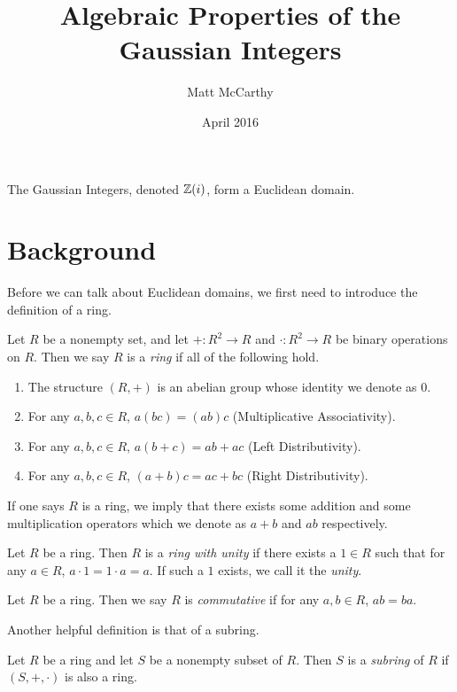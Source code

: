 \documentclass[notitlepage]{simple}
\title{Algebraic Properties of the Gaussian Integers}
\author{Matt McCarthy}
\date{April 2016}
\begin{document}
\maketitle

\begin{thm*}
	The Gaussian Integers, denoted $\mathbb{Z}(i)$, form a Euclidean domain.
\end{thm*}

\section{Background}

Before we can talk about Euclidean domains, we first need to introduce the definition of a ring.

\begin{definition}[Ring]
	Let $R$ be a nonempty set, and let $+:R^2\rightarrow R$ and $\cdot:R^2\rightarrow R$ be binary operations on $R$.
	Then we say $R$ is a \textit{ring} if all of the following hold.
	\begin{enumerate}
		\item The structure $(R,+)$ is an abelian group whose identity we denote as 0.
		\item For any $a,b,c\in R$, $a(bc)=(ab)c$ (Multiplicative Associativity).
		\item For any $a,b,c\in R$, $a(b+c)=ab+ac$ (Left Distributivity).
		\item For any $a,b,c\in R$, $(a+b)c=ac+bc$ (Right Distributivity).
	\end{enumerate}
	If one says $R$ is a ring, we imply that there exists some addition and some multiplication operators which we denote as $a+b$ and $ab$ respectively.
\end{definition}

\begin{definition}
	Let $R$ be a ring.
	Then $R$ is a \textit{ring with unity} if there exists a $1\in R$ such that for any $a\in R$, $a\cdot 1 = 1\cdot a = a$.
	If such a $1$ exists, we call it the \textit{unity}.
\end{definition}

\begin{definition}
	Let $R$ be a ring.
	Then we say $R$ is \textit{commutative} if for any $a,b\in R$, $ab=ba$.
\end{definition}

Another helpful definition is that of a subring.

\begin{definition}[Subring]
	Let $R$ be a ring and let $S$ be a nonempty subset of $R$.
	Then $S$ is a \textit{subring} of $R$ if $(S,+,\cdot)$ is also a ring.
\end{definition}
\end{document}
